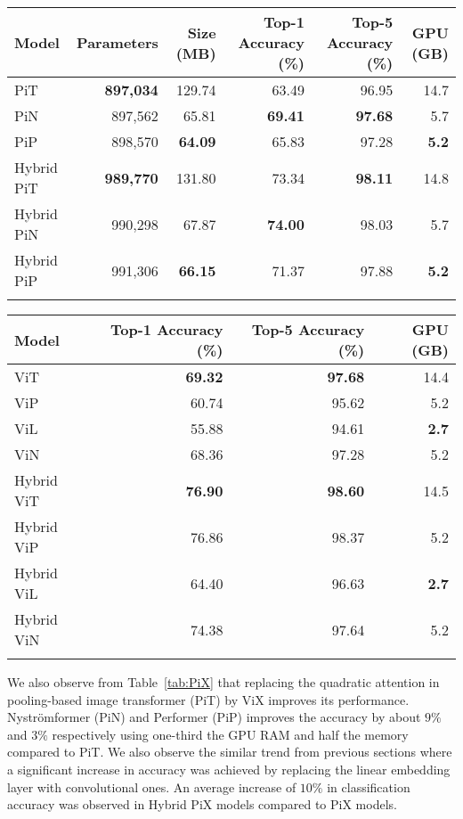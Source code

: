 \documentclass{article}
\begin{document}
\begin{table*}[h]
\centering
\begin{tabular}{lrrrrr}
\hline
\textbf{Model} & \textbf{Parameters} & \textbf{Size (MB)} & \textbf{Top-1 Accuracy (\%)} & \textbf{Top-5 Accuracy (\%)} & \textbf{GPU (GB)} \\ \hline
PiT & \textbf{897,034} & 129.74 & 63.49 & 96.95 & 14.7 \\
PiN & 897,562 & 65.81 & \textbf{69.41} & \textbf{97.68} & 5.7 \\
PiP & 898,570 & \textbf{64.09} & 65.83 & 97.28 & \textbf{5.2} \\ \hline
Hybrid PiT & \textbf{989,770} & 131.80 & 73.34 & \textbf{98.11} & 14.8 \\
Hybrid PiN &  990,298 & 67.87 & \textbf{74.00} & 98.03 & 5.7 \\
Hybrid PiP & 991,306 & \textbf{66.15} & 71.37 & 97.88 & \textbf{5.2} \\ \hline \\
\end{tabular}\caption{Comparison of performance by replacing attention with X-formers in PiT for classification of CIFAR-10 dataset}
\label{tab:PiX}
\end{table*}
\begin{table*}[h]
\centering

\begin{tabular}{lrrr}
\hline
\textbf{Model}  & \textbf{Top-1 Accuracy (\%)} & \textbf{Top-5 Accuracy (\%)} & \textbf{GPU (GB)}\\ \hline
ViT & \textbf{69.32} & \textbf{97.68} & 14.4 \\
ViP &  60.74 & 95.62 & 5.2 \\
ViL & 55.88 & 94.61 & \textbf{2.7} \\
ViN & 68.36 & 97.28 & 5.2 \\ \hline
Hybrid ViT & \textbf{76.90} & \textbf{98.60} & 14.5 \\
Hybrid ViP & 76.86 & 98.37 & 5.2 \\
Hybrid ViL & 64.40 & 96.63 & \textbf{2.7} \\
Hybrid ViN & 74.38 & 97.64 & 5.2 \\ \hline \\
\end{tabular}\caption{Performance of ViX and Hybrid ViX models using Rotary Position Embedding on CIFAR-10 dataset}
\label{tab:RoPE}
\end{table*}

 
We also observe from Table~\ref{tab:PiX} that replacing the quadratic attention in pooling-based image transformer (PiT) by ViX improves its performance. Nyströmformer (PiN) and Performer (PiP) improves the accuracy by about $9 \%$ and $3 \%$ respectively using one-third the GPU RAM and half the memory compared to PiT. We also observe the similar trend from previous sections where a significant increase in accuracy was achieved by replacing the linear embedding layer with convolutional ones. An average increase of $10\%$ in classification accuracy was observed in Hybrid PiX models compared to PiX models.
\end{document}

